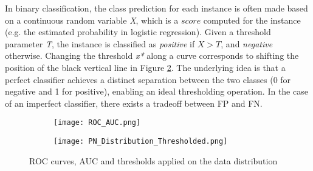 In binary classification, the class prediction for each instance is often made based on a continuous random variable \textit{X}, which is a $score$ computed for the instance (e.g. the estimated probability in logistic regression). 
Given a threshold parameter \textit{T}, the instance is classified as \textit{positive} if $X > T$, and \textit{negative} otherwise. 
Changing the threshold \textit{x*} along a curve corresponds to shifting the position of the black vertical line in Figure \ref{fig:PNDistribution}. 
The underlying idea is that a perfect classifier achieves a distinct separation between the two classes (0 for negative and 1 for positive), enabling an ideal thresholding operation.
In the case of an imperfect classifier, there exists a tradeoff between FP and FN.
\begin{figure}[H]
  \centering
  \begin{subfigure}{0.73\linewidth}
    \texttt{[image: ROC\_AUC.png]}
    \caption{}
    \label{fig:ROC_AUC}
  \end{subfigure}
  \begin{subfigure}{0.65\linewidth}
    \texttt{[image: PN\_Distribution\_Thresholded.png]}
    \caption{}
    \label{fig:PNDistribution}
  \end{subfigure}
  \caption{ROC curves, AUC and thresholds applied on the data distribution}
  \label{fig:ROC}
\end{figure}